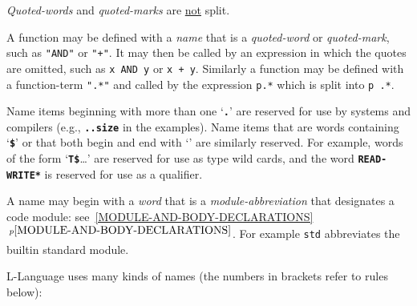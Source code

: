 \documentclass[12pt]{article}
\newcommand{\TT}[1]{{\tt \bfseries #1}}
\newcommand{\itemref}[1]{\ref{#1}$\,^{p\pageref{#1}}$}
\begin{document}
{\em Quoted-words} and {\em quoted-marks} are \underline{not} split.

A function may be defined with a {\em name} that is a {\em quoted-word}
or {\em quoted-mark},
such as {\tt "AND"} or {\tt "+"}.
It may then be called by an expression in which the
quotes are omitted, such as {\tt x AND y} or {\tt x + y}.
Similarly a function may be
defined with a function-term {\tt ".*"} and called by the expression
{\tt p.*} which is split into {\tt p .*}.


Name items beginning with more than one `\TT{.}' are reserved
for use by systems and compilers (e.g., \TT{..size} in the examples).
Name items that are words containing `\TT{\$}' or that both
begin and end with `\TT{*}' are
similarly reserved.  For example, words of the form `\TT{T\$}\ldots'
are reserved for use as type wild cards, and the word \TT{*READ-WRITE*}
is reserved for use as a qualifier.

A name may begin with a {\em word} that is a {\em module-abbreviation}
that designates a code module: see~\itemref{MODULE-AND-BODY-DECLARATIONS}.
For example {\tt std} abbreviates the builtin standard module.

L-Language uses many kinds of names (the numbers in brackets refer to
rules below):
\end{document}
